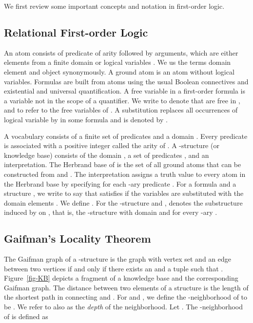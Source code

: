 \documentclass{article}
\begin{document}
We first review some important concepts and notation in first-order logic.


\subsection{Relational First-order Logic}

An atom  consists of predicate  of arity  followed by  arguments, which are either elements from a finite domain  or logical variables . We us the terms domain element and object synonymously. A ground atom is an atom without logical variables. Formulas are built from atoms using the usual Boolean connectives and existential and universal quantification. A free variable in a first-order formula is a variable  not in the scope of a quantifier. We write  to denote that  are free in , and  to refer to the free variables of . A substitution replaces all occurrences of logical variable  by  in some formula  and is denoted by . 

A vocabulary consists of a finite set of predicates  and a domain . Every predicate  is associated with a positive integer called the arity of . 
A -structure (or knowledge base)  consists of the domain , a set of predicates , and an interpretation. The Herbrand base of  is the set of all ground atoms that can be constructed from  and . The interpretation assigns a truth value to every atom in the Herbrand base by specifying   for each -ary predicate . For a formula  and a structure , we write  to say that  satisfies  if the variables  are substituted with the domain elements .  We define  .
For the -structure  and  ,  denotes the substructure induced by  on , that is, the -structure  with domain  and  for every -ary .

\subsection{Gaifman's Locality Theorem}



The Gaifman graph of a -structure  is the graph  with vertex set  and an edge between two vertices  if and only if there exists an  and a tuple  such that . Figure~\ref{fig-KB} depicts a fragment of a knowledge base and the corresponding Gaifman graph. 
The distance  between two elements  of a structure  is the length of the shortest path in  connecting  and . For  and , we define the -neighborhood of  to be . We refer to  also as the \emph{depth} of the neighborhood. 
Let . The -neighborhood of  is defined as 
\end{document}
